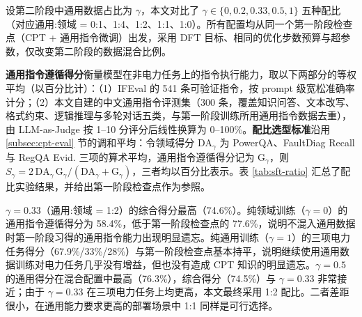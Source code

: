 \documentclass[fontset=fandol,type=master,campus=shenzhen,etitleauto=true]{hithesisbook}
\begin{document}
设第二阶段中通用数据占比为 $\gamma$，本文对比了 $\gamma \in \{0, 0.2, 0.33, 0.5, 1\}$ 五种配比（对应通用:领域 = 0:1、1:4、1:2、1:1、1:0）。所有配置均从同一个第一阶段检查点（CPT + 通用指令微调）出发，采用 DFT 目标、相同的优化步数预算与超参数，仅改变第二阶段的数据混合比例。

\textbf{通用指令遵循得分}衡量模型在非电力任务上的指令执行能力，取以下两部分的等权平均（以百分比计）：（1）IFEval\cite{ref85} 的 541 条可验证指令，按 prompt 级宽松准确率计分；（2）本文自建的中文通用指令评测集（300 条，覆盖知识问答、文本改写、格式约束、逻辑推理与多轮对话五类，与第一阶段训练所用通用指令数据去重），由 LLM-as-Judge 按 1--10 分评分后线性换算为 0--100\%。\textbf{配比选型标准}沿用 \ref{subsec:cpt-eval} 节的调和平均：令领域得分 $\text{DA}_\gamma$ 为 PowerQA、FaultDiag Recall 与 RegQA Evid. 三项的算术平均，通用指令遵循得分记为 $\text{G}_\gamma$，则 $S_\gamma = 2\,\text{DA}_\gamma\,\text{G}_\gamma / (\text{DA}_\gamma + \text{G}_\gamma)$，三者均以百分比表示。表 \ref{tab:sft-ratio} 汇总了配比实验结果，并给出第一阶段检查点作为参照。

\begin{table}[htbp]
\centering
\caption{SFT 第二阶段通用-领域数据配比实验结果}
\label{tab:sft-ratio}
\small
\setlength{\tabcolsep}{4pt}
\end{table}

$\gamma = 0.33$（通用:领域 = 1:2）的综合得分最高（74.6\%）。纯领域训练（$\gamma = 0$）的通用指令遵循得分为 58.4\%，低于第一阶段检查点的 77.6\%，说明不混入通用数据时第一阶段习得的通用指令能力出现明显遗忘。纯通用训练（$\gamma = 1$）的三项电力任务得分（67.9\%/33\%/28\%）与第一阶段检查点基本持平，说明继续使用通用数据训练对电力任务几乎没有增益，但也没有造成 CPT 知识的明显遗忘。$\gamma = 0.5$ 的通用得分在混合配置中最高（76.3\%），综合得分（74.5\%）与 $\gamma = 0.33$ 非常接近；由于 $\gamma = 0.33$ 在三项电力任务上均更高，本文最终采用 1:2 配比。二者差距很小，在通用能力要求更高的部署场景中 1:1 同样是可行选择。
\end{document}

